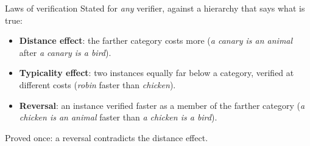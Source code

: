 \documentclass[aspectratio=169,11pt]{beamer}
\begin{document}
\begin{frame}{Laws of verification}
  Stated for \emph{any} verifier, against a hierarchy that says what is true:
  \begin{itemize}
    \item \textbf{Distance effect}: the farther category costs more (\emph{a canary is an animal} after \emph{a canary is a bird}).
    \item \textbf{Typicality effect}: two instances equally far below a category, verified at different costs (\emph{robin} faster than \emph{chicken}).
    \item \textbf{Reversal}: an instance verified faster as a member of the farther category (\emph{a chicken is an animal} faster than \emph{a chicken is a bird}).
  \end{itemize}
  \bigskip
  Proved once: a reversal contradicts the distance effect.
\end{frame}
\end{document}
